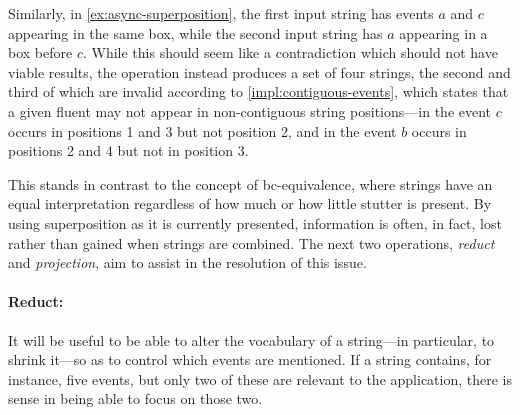 \documentclass[a4paper,12pt,leqno]{article}
\newcommand{\bc}{{\rm b\!c}}
\newcommand{\vph}[1]{\vphantom{#1}}
\newcommand{\ebox}[1]{\fbox{$\vph{'(),}#1$}}
\newcommand{\EventString}[1]{%
	\renewcommand*{\do}[1]{\ebox{##1}}%
	\PipeParser{#1}%
}
\begin{document}
Similarly, in \cref{ex:async-superposition}, the first input string has events $a$ and $c$ appearing in the same box, while the second input string has $a$ appearing in a box before $c$. While this should seem like a contradiction which should not have viable results, the operation instead produces a set of four strings, the second and third of which are invalid according to \cref{impl:contiguous-events}, which states that a given fluent may not appear in non-contiguous string positions---in \EventString{a,c|a,b,d|b,c,d} the event $c$ occurs in positions 1 and 3 but not position 2, and in \EventString{a,c|a,b,c|a,c,d|b,c,d} the event $b$ occurs in positions 2 and 4 but not in position 3.

This stands in contrast to the concept of \bc-equivalence, where strings have an equal interpretation regardless of how much or how little stutter is present. By using superposition as it is currently presented, information is often, in fact, lost rather than gained when strings are combined. The next two operations, \textit{reduct} and \textit{projection}, aim to assist in the resolution of this issue.

\paragraph{Reduct:}\label{para:str-op-reduct}
It will be useful to be able to alter the vocabulary of a string---in particular, to shrink it---so as to control which events are mentioned. If a string contains, for instance, five events, but only two of these are relevant to the application, there is sense in being able to focus on those two.
\end{document}
